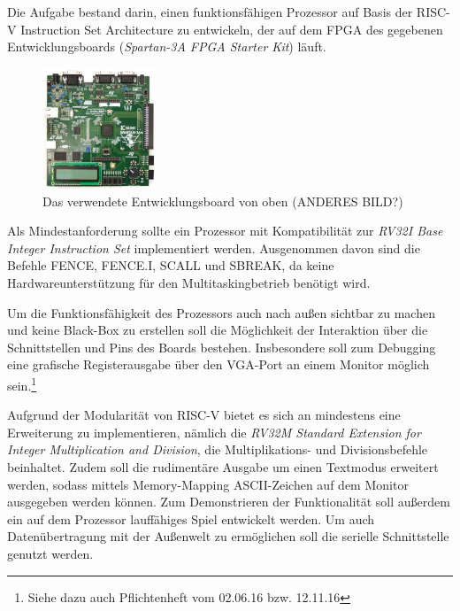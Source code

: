 

Die Aufgabe bestand darin, einen funktionsf\"ahigen Prozessor auf Basis der RISC-V Instruction Set Architecture zu entwickeln, der auf dem FPGA des gegebenen Entwicklungsboards (\textit{Spartan-3A FPGA Starter Kit}) l\"auft.
\begin{figure}[H]
	\centering
		\includegraphics[width=0.3\textwidth]{Board.png}
	\caption{Das verwendete Entwicklungsboard von oben  (ANDERES BILD?)}
	\label{fig:board}
\end{figure}


Als Mindestanforderung sollte ein Prozessor mit Kompatibilit\"at zur \textit{RV32I Base Integer Instruction Set} implementiert werden. Ausgenommen davon sind die Befehle FENCE, FENCE.I, SCALL und SBREAK, da keine Hardwareunterst\"utzung f\"ur den Multitaskingbetrieb ben\"otigt wird.

Um die Funktionsf\"ahigkeit des Prozessors auch nach au{\ss}en sichtbar zu machen und keine Black-Box zu erstellen soll die M\"oglichkeit der Interaktion \"uber die Schnittstellen und Pins des Boards bestehen. Insbesondere soll zum Debugging eine grafische Registerausgabe \"uber den VGA-Port an einem Monitor m\"oglich sein.\footnote{Siehe dazu auch Pflichtenheft vom 02.06.16 bzw. 12.11.16}


Aufgrund der Modularit\"at von RISC-V bietet es sich an mindestens eine Erweiterung zu implementieren, n\"amlich die \textit{RV32M Standard Extension for Integer Multiplication and Division}, die Multiplikations- und Divisionsbefehle beinhaltet. Zudem soll die rudiment\"are Ausgabe um einen Textmodus erweitert werden, sodass mittels Memory-Mapping ASCII-Zeichen auf dem Monitor ausgegeben werden k\"onnen. Zum Demonstrieren der Funktionalit\"at soll au{\ss}erdem ein auf dem Prozessor lauff\"ahiges Spiel entwickelt werden. Um auch Daten\"ubertragung mit der Au{\ss}enwelt zu erm\"oglichen soll die serielle Schnittstelle genutzt werden.

